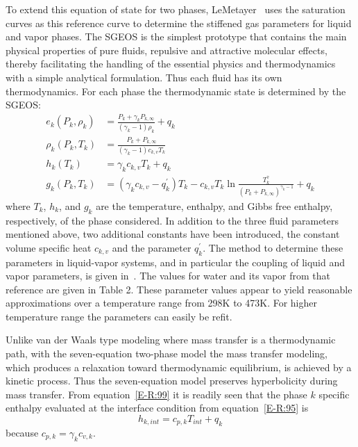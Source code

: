To extend this equation of state for two phases,
LeMetayer~\cite{SGEOS} uses the saturation curves as this
reference curve to determine the stiffened gas parameters for liquid
and vapor phases.  The SGEOS is the simplest prototype that contains
the main physical properties of pure fluids, repulsive and attractive
molecular effects, thereby facilitating the handling of the essential
physics and thermodynamics with a simple analytical formulation.  Thus
each fluid has its own thermodynamics.  For each phase the
thermodynamic state is determined by the SGEOS:
\begin{align}
  \label{E-R:97}
  e_k(P_k,\rho_k) &= \frac{P_k+\gamma_k P_{k,\infty}}{(\gamma_k -1) \rho_k} + q_k
  \\
  \label{E-R:98}
  \rho_k (P_k,T_k) &= \frac{P_k+P_{k,\infty}}{(\gamma_k -1) c_{k,v} T_k}
  \\
  \label{E-R:99}
  h_k(T_k) &= \gamma_k  c_{k,v} T_k + q_k
  \\
  \label{E-R:100}
  g_k(P_k,T_k) &= \left(\gamma_k c_{k,v} - q^{'}_k \right) T_k - c_{k,v} T_k \ln \frac{T_k^\gamma}{\left(P_k+P_{k,\infty}\right)^{\gamma_k-1}} + q_k
\end{align}
where $T_k$, $h_k$, and $g_k$ are the temperature, enthalpy,
and Gibbs free enthalpy, respectively, of the phase considered.  In
addition to the three fluid parameters mentioned above, two
additional constants have been introduced, the constant
volume specific heat $c_{k,v}$ and the parameter $q^{'}_k$.  The method to
determine these parameters in liquid-vapor systems, and in particular
the coupling of liquid and vapor parameters, is given
in~\cite{SGEOS}.  The values for water and its vapor from that
reference are given in Table 2.  These parameter values appear to
yield reasonable approximations over a temperature range from 298K to
473K.  For higher temperature range the parameters can easily be
refit.

Unlike van der Waals type modeling where mass transfer is a
thermodynamic path, with the seven-equation two-phase model the mass
transfer modeling, which produces a relaxation toward thermodynamic
equilibrium, is achieved by a kinetic process.  Thus the seven-equation
model preserves hyperbolicity during mass transfer.
From equation~\eqref{E-R:99} it is readily seen that the phase
$k$ specific enthalpy evaluated at the interface condition from
equation~\eqref{E-R:95} is
\begin{equation}
  h_{k,  int} = c_{p, k}  T_{int} + q_k
\end{equation}
because $c_{p, k} = \gamma_k  c_{v, k}$.

